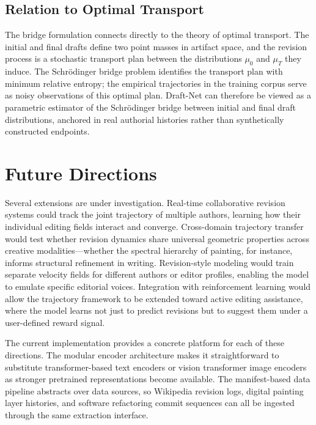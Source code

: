 \documentclass[12pt,a4paper]{article}
\theoremstyle{draftthm}
\begin{document}
\subsection{Relation to Optimal Transport}

The bridge formulation connects directly to the theory of optimal transport. The initial and final drafts define two point masses in artifact space, and the revision process is a stochastic transport plan between the distributions $\mu_0$ and $\mu_T$ they induce. The Schrödinger bridge problem identifies the transport plan with minimum relative entropy; the empirical trajectories in the training corpus serve as noisy observations of this optimal plan. Draft-Net can therefore be viewed as a parametric estimator of the Schrödinger bridge between initial and final draft distributions, anchored in real authorial histories rather than synthetically constructed endpoints.

\section{Future Directions}

Several extensions are under investigation. Real-time collaborative revision systems could track the joint trajectory of multiple authors, learning how their individual editing fields interact and converge. Cross-domain trajectory transfer would test whether revision dynamics share universal geometric properties across creative modalities---whether the spectral hierarchy of painting, for instance, informs structural refinement in writing. Revision-style modeling would train separate velocity fields for different authors or editor profiles, enabling the model to emulate specific editorial voices. Integration with reinforcement learning would allow the trajectory framework to be extended toward active editing assistance, where the model learns not just to predict revisions but to suggest them under a user-defined reward signal.

The current implementation provides a concrete platform for each of these directions. The modular encoder architecture makes it straightforward to substitute transformer-based text encoders or vision transformer image encoders as stronger pretrained representations become available. The manifest-based data pipeline abstracts over data sources, so Wikipedia revision logs, digital painting layer histories, and software refactoring commit sequences can all be ingested through the same extraction interface.
\end{document}
